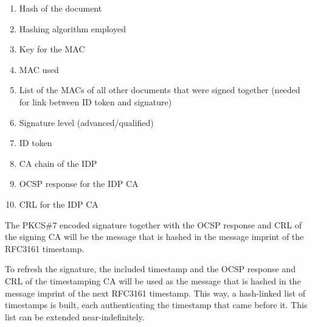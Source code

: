 \begin{enumerate}
    \item Hash of the document
    \item Hashing algorithm employed
    \item Key for the \gls{MAC}
    \item \gls{MAC} used
    \item List of the \gls{MAC}s of all other documents that were signed together (needed for link between ID token and signature)
    \item Signature level (advanced/qualified)
    \item ID token
    \item \gls{CA} chain of the \gls{IDP}
    \item \gls{OCSP} response for the \gls{IDP} \gls{CA}
    \item \gls{CRL} for the \gls{IDP} \gls{CA}
\end{enumerate}

The \gls{PKCS}\#7 encoded signature together with the \gls{OCSP} response and \gls{CRL} of the signing \gls{CA} will be the message that is hashed in the message imprint of the \gls{RFC}3161 timestamp.

To refresh the signature,
the included timestamp and the \gls{OCSP} response and \gls{CRL} of the timestamping \gls{CA} will be used as the message that is hashed in the message imprint of the next \gls{RFC}3161 timestamp.
This way, a hash-linked list of timestamps is built, each authenticating the timestamp that came before it.
This list can be extended near-indefinitely.

